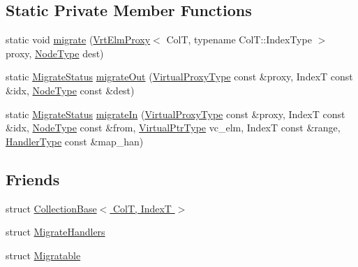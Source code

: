 \subsection*{Static Private Member Functions}
\begin{DoxyCompactItemize}
\item 
static void \hyperlink{structvt_1_1vrt_1_1collection_1_1_collection_elm_attorney_aa7e23dcc55cf4df77445b9795a32f44e}{migrate} (\hyperlink{structvt_1_1vrt_1_1collection_1_1_vrt_elm_proxy}{Vrt\+Elm\+Proxy}$<$ ColT, typename Col\+T\+::\+Index\+Type $>$ proxy, \hyperlink{namespacevt_a866da9d0efc19c0a1ce79e9e492f47e2}{Node\+Type} dest)
\item 
static \hyperlink{namespacevt_1_1vrt_1_1collection_ad221ad8aea9e586689b4335f5bcd9804}{Migrate\+Status} \hyperlink{structvt_1_1vrt_1_1collection_1_1_collection_elm_attorney_a672eb9e913410235692033f5b7ea24b5}{migrate\+Out} (\hyperlink{namespacevt_a1b417dd5d684f045bb58a0ede70045ac}{Virtual\+Proxy\+Type} const \&proxy, IndexT const \&idx, \hyperlink{namespacevt_a866da9d0efc19c0a1ce79e9e492f47e2}{Node\+Type} const \&dest)
\item 
static \hyperlink{namespacevt_1_1vrt_1_1collection_ad221ad8aea9e586689b4335f5bcd9804}{Migrate\+Status} \hyperlink{structvt_1_1vrt_1_1collection_1_1_collection_elm_attorney_a61d72926494c457dfb2fec52c697e208}{migrate\+In} (\hyperlink{namespacevt_a1b417dd5d684f045bb58a0ede70045ac}{Virtual\+Proxy\+Type} const \&proxy, IndexT const \&idx, \hyperlink{namespacevt_a866da9d0efc19c0a1ce79e9e492f47e2}{Node\+Type} const \&from, \hyperlink{structvt_1_1vrt_1_1collection_1_1_collection_elm_attorney_a36fe2c7f590baec1038c592db59a6315}{Virtual\+Ptr\+Type} vc\+\_\+elm, IndexT const \&range, \hyperlink{namespacevt_af64846b57dfcaf104da3ef6967917573}{Handler\+Type} const \&map\+\_\+han)
\end{DoxyCompactItemize}
\subsection*{Friends}
\begin{DoxyCompactItemize}
\item 
struct \hyperlink{structvt_1_1vrt_1_1collection_1_1_collection_elm_attorney_a4fb39ed9be2f0de84b237088ececde3f}{Collection\+Base$<$ Col\+T, Index\+T $>$}
\item 
struct \hyperlink{structvt_1_1vrt_1_1collection_1_1_collection_elm_attorney_af2ee449d95081faa04ebc6b8ae6516ed}{Migrate\+Handlers}
\item 
struct \hyperlink{structvt_1_1vrt_1_1collection_1_1_collection_elm_attorney_a5137563a7cb738979426be13c3089839}{Migratable}
\end{DoxyCompactItemize}


